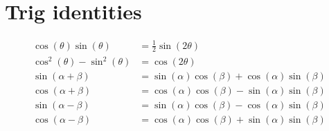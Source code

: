 \section{Trig identities}
\begin{align}
    \cos(\theta)\sin(\theta) &= \frac{1}{2}\sin(2\theta)\\
    \cos^2(\theta)-\sin^2(\theta) &= \cos(2\theta)\\
    \sin(\alpha+\beta) &= \sin(\alpha)\cos(\beta) + \cos(\alpha)\sin(\beta)\\
    \cos(\alpha+\beta) &= \cos(\alpha)\cos(\beta) - \sin(\alpha)\sin(\beta)\\
    \sin(\alpha-\beta) &= \sin(\alpha)\cos(\beta) - \cos(\alpha)\sin(\beta)\\
    \cos(\alpha-\beta) &= \cos(\alpha)\cos(\beta) + \sin(\alpha)\sin(\beta)
\end{align}

